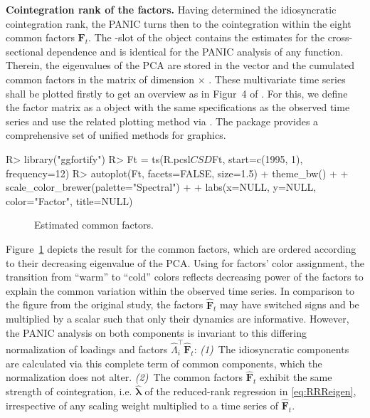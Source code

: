 \textbf{Cointegration rank of the factors.} Having determined the idiosyncratic cointegration rank, the PANIC turns then to the cointegration within the eight common factors $ \boldsymbol{F}_{t} $. The -slot of the  object contains the estimates for the cross-sectional dependence and is identical for the PANIC analysis of any  function. Therein, the eigenvalues of the PCA are stored in the vector  and the cumulated common factors in the matrix  of dimension  $ \times $ . These multivariate time series shall be plotted firstly to get an overview as in Figur~4 of \citet[p.~71]{ArsovaOersal2017}. For this, we define the factor matrix  as a  object with the same specifications as the observed time series and use the related plotting method via . The package  \citep{TangEtAl2016} provides a comprehensive set of unified methods for  graphics.
\begin{CodeChunk}
\begin{CodeInput}
R> library("ggfortify")
R> Ft = ts(R.pcsl$CSD$Ft, start=c(1995, 1), frequency=12)
R> autoplot(Ft, facets=FALSE, size=1.5) + theme_bw() + 
+     scale_color_brewer(palette="Spectral") +
+     labs(x=NULL, y=NULL, color="Factor", title=NULL)
\end{CodeInput}
\end{CodeChunk}
\begin{figure}[ht] %
	\centering
	\caption{Estimated common factors.}
	\resizebox{0.8\textwidth}{!}{
		}
	\label{fig:Factors}
\end{figure}
Figure~\ref{fig:Factors} depicts the  result for the common factors, which are ordered according to their decreasing eigenvalue of the PCA. Using  for factors' color assignment, the transition from ``warm'' to ``cold'' colors reflects decreasing power of  the factors to explain the common variation within the observed time series. In comparison to the figure from the original study, the factors $ \boldsymbol{\hat{F}}_t $ may have switched signs and be multiplied by a scalar such that only their dynamics are informative. However, the PANIC analysis on both components is invariant to this differing normalization of loadings and factors $ \hat{\Lambda}_i^\top \boldsymbol{\hat{F}}_t $: \textit{(1)}~The idiosyncratic components are calculated via this complete term of common components, which the normalization does not alter. \textit{(2)}~The common factors $ \boldsymbol{\hat{F}}_{t} $ exhibit the same strength of cointegration, i.e. $ \boldsymbol{\hat{\lambda}} $ of the reduced-rank regression in \eqref{eq:RRReigen}, irrespective of any scaling weight multiplied to a time series of $ \boldsymbol{\hat{F}}_{t} $.


